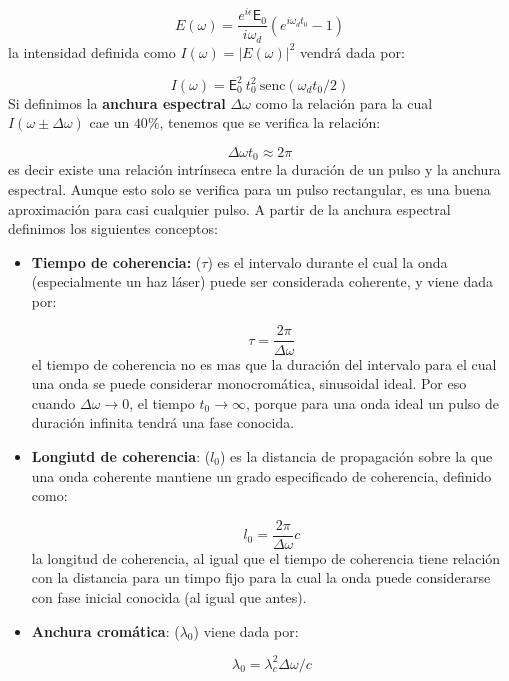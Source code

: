 \documentclass[12pt,a4paper]{book}
\numberwithin{equation}{section}
\numberwithin{figure}{section}
\newcommand{\1}{_{(1)}}
\newcommand{\2}{_{(2)}}
\theoremstyle{definition}
\begin{document}
\begin{equation}
E(\omega) = \frac{e^{i \epsilon} \mathsf{E}_0 }{i \omega_d} (e^{i \omega_d t_0} -1)
\end{equation}
la intensidad definida como $I(\omega) = |E(\omega)|^2$ vendrá dada por:

\begin{equation}
I (\omega) = \mathsf{E}_0^2 \ t_0^2 \ \mathrm{senc} (\omega_d t_0 /2)
\end{equation}
Si definimos la \textbf{anchura espectral} $\Delta\omega$ como la relación para la cual $I(\omega\pm\Delta\omega)$ cae un $40\%$, tenemos que se verifica la relación:

\begin{equation}
\Delta \omega t_0 \approx 2 \pi
\end{equation}
es decir existe una relación intrínseca entre la duración de un pulso y la anchura espectral. Aunque esto solo se verifica para un pulso rectangular, es una buena aproximación para casi cualquier pulso. A partir de la anchura espectral definimos los siguientes conceptos:

\begin{itemize}
\item \textbf{Tiempo de coherencia:} ($\tau$) es el intervalo durante el cual la onda (especialmente un haz láser) puede ser considerada coherente, y viene dada por:

\begin{equation}
\tau = \dfrac{2 \pi}{\Delta \omega}
\end{equation}
el tiempo de coherencia no es mas que la duración del intervalo para el cual una onda se puede considerar monocromática, sinusoidal ideal. Por eso cuando $\Delta \omega \rightarrow 0$, el tiempo $t_0 \rightarrow \infty$, porque para una onda ideal un pulso de duración infinita tendrá una fase conocida. 

\item \textbf{Longiutd de coherencia}: ($l_0$) es la distancia de propagación sobre la que una onda coherente mantiene un grado especificado de coherencia, definido como:

\begin{equation}
l_0 = \dfrac{2 \pi}{\Delta \omega} c 
\end{equation}
la longitud de coherencia, al igual que el tiempo de coherencia tiene relación con la distancia para un timpo fijo para la cual la onda puede considerarse con fase inicial conocida (al igual que antes).

\item \textbf{Anchura cromática}: ($\lambda_0$) viene dada por:

\begin{equation}
\lambda_0 = \lambda_c^2 \Delta \omega / c
\end{equation}
\end{itemize}
\end{document}
